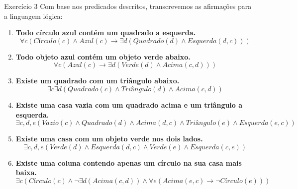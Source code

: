 \documentclass[a4paper,11pt]{article}
\theoremstyle{definition}
\theoremstyle{plain}
\theoremstyle{remark}
\newcounter{questao}[section]
\begin{document}
\newpage \begin{questaoManually}{Exercício 3}
Com base nos predicados descritos, transcrevemos as afirmações para a linguagem lógica:

\begin{enumerate}
\item \textbf{Todo círculo azul contém um quadrado a esquerda.}
\begin{equation}
\forall c (Círculo(c) \land Azul(c) \to \exists d (Quadrado(d) \land Esquerda(d, c)))
\end{equation}

\item \textbf{Todo objeto azul contém um objeto verde abaixo.}
\begin{equation}
\forall c (Azul(c) \to \exists d (Verde(d) \land Acima(c, d)))
\end{equation}

\item \textbf{Existe um quadrado com um triângulo abaixo.}
\begin{equation}
\exists c \exists d (Quadrado(c) \land Triângulo(d) \land Acima(c, d))
\end{equation}

\item \textbf{Existe uma casa vazia com um quadrado acima e um triângulo a esquerda.}
\begin{equation}
\exists c, d, e (Vazio(c) \land Quadrado(d) \land Acima(d, c) \land Triângulo(e) \land Esquerda(e, c))
\end{equation}

\item \textbf{Existe uma casa com um objeto verde nos dois lados.}
\begin{equation}
\exists c, d, e (Verde(d) \land Esquerda(d, c) \land Verde(e) \land Esquerda(c, e))
\end{equation}

\item \textbf{Existe uma coluna contendo apenas um círculo na sua casa mais baixa.}
\begin{equation}
\exists c (Círculo(c) \land \neg \exists d (Acima(c, d)) \land \forall e (Acima(e, c) \to \neg Círculo(e)))
\end{equation}
\end{enumerate}

\end{questaoManually}
\end{document}
